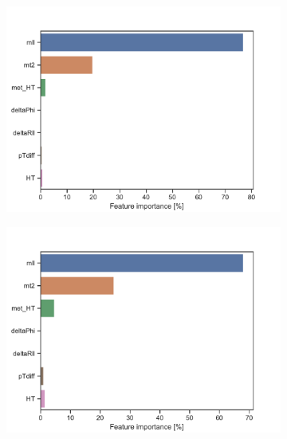 \begin{figure}[H]
    \centering
    \begin{subfigure}[t!]{0.49\textwidth}
        \includegraphics[width = \textwidth]{Figures/SlepSlep/ML/BDT/High_level/High/featureImportance.pdf}
        \caption{}
        \label{fig:featSlepslepLow}
    \end{subfigure}
    \begin{subfigure}[t!]{0.49\textwidth}
        \includegraphics[width = \textwidth]{Figures/SlepSnu/BDT/High_level/High/featureImportance.pdf}
        \caption{}
        \label{fig:featSlepsnuLow}
    \end{subfigure}
    \begin{subfigure}[t!]{0.49\textwidth}

\end{subfigure}
\end{figure}
